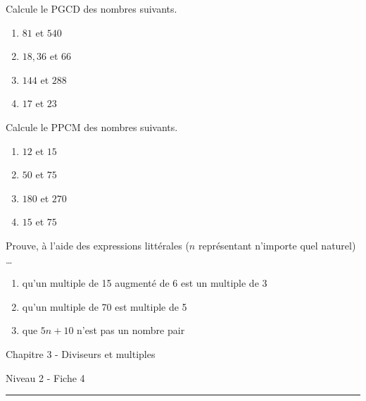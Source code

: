 \documentclass[12pt,parskip=half-, twoside=semi]{scrartcl}
\begin{document}
      \begin{exercise}
        Calcule le PGCD des nombres suivants. 
          \begin{enumerate}[cols=2]
            \item $81$ et $540$
            \item $18, 36$ et $66$
            \item $144$ et $288$
            \item $17$ et $23$
          \end{enumerate}
      \end{exercise}
      
      \begin{exercise}
        Calcule le PPCM des nombres suivants.
          \begin{enumerate}[cols=2]
            \item $12$ et $15$
            \item $50$ et $75$
            \item $180$ et $270$
            \item $15$ et $75$
          \end{enumerate}
      \end{exercise}
      
      \begin{exercise}
        Prouve, à l'aide des expressions littérales (\(n\) représentant n'importe quel naturel) \dots 
        \begin{enumerate}
          \item qu'un multiple de 15 augmenté de 6 est un multiple de 3
          \item qu'un multiple de 70 est multiple de 5 
          \item que \(5n+10\) n'est pas un nombre pair
        \end{enumerate}
      \end{exercise}

\newpage


\begin{center}
  \bfseries
  \begin{Huge}
    Chapitre 3 - Diviseurs et multiples
  \end{Huge}
  \smallbreak
  \begin{large}
    Niveau 2  - Fiche 4
  \end{large}
  \smallbreak
  \rule[10pt]{.5\linewidth}{1 pt}
\end{center}

\setcounter{exercise}{0}
      
\end{document}
